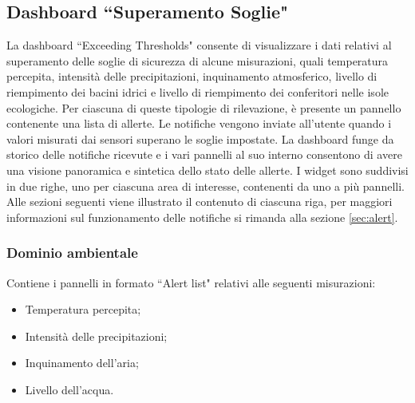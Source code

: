 \documentclass[8pt]{article}
\begin{document}
\subsection{Dashboard ``Superamento Soglie"} \label{sec:thresholds}
La dashboard ``Exceeding Thresholds" consente di visualizzare i dati relativi al superamento delle soglie di sicurezza di alcune misurazioni, quali temperatura percepita, intensità delle precipitazioni, inquinamento atmosferico, livello di riempimento dei bacini idrici e livello di riempimento dei conferitori nelle isole ecologiche. Per ciascuna di queste tipologie di rilevazione, è presente un pannello contenente una lista di allerte. Le notifiche vengono inviate all'utente quando i valori misurati dai sensori superano le soglie impostate. La dashboard funge da storico delle notifiche ricevute e i vari pannelli al suo interno consentono di avere una visione panoramica e sintetica dello stato delle allerte. I widget sono suddivisi in due righe, uno per ciascuna area di interesse, contenenti da uno a più pannelli. Alle sezioni seguenti viene illustrato il contenuto di ciascuna riga, per maggiori informazioni sul funzionamento delle notifiche si rimanda alla sezione \ref{sec:alert}.
\subsubsection{Dominio ambientale}
Contiene i pannelli in formato ``Alert list" relativi alle seguenti misurazioni:
\begin{itemize}
\setlength\itemsep{0em}
    \item Temperatura percepita;
    \item Intensità delle precipitazioni;
    \item Inquinamento dell'aria;
    \item Livello dell'acqua.
\end{itemize}

\end{document}
